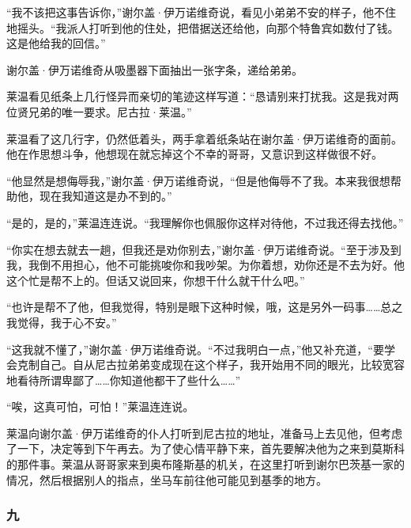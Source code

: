 \par “我不该把这事告诉你，”谢尔盖·伊万诺维奇说，看见小弟弟不安的样子，他不住地摇头。“我派人打听到他的住处，把借据送还给他，向那个特鲁宾如数付了钱。这是他给我的回信。”
\par 谢尔盖·伊万诺维奇从吸墨器下面抽出一张字条，递给弟弟。
\par 莱温看见纸条上几行怪异而亲切的笔迹这样写道：“恳请别来打扰我。这是我对两位贤兄弟的唯一要求。尼古拉·莱温。”
\par 莱温看了这几行字，仍然低着头，两手拿着纸条站在谢尔盖·伊万诺维奇的面前。他在作思想斗争，他想现在就忘掉这个不幸的哥哥，又意识到这样做很不好。
\par “他显然是想侮辱我，”谢尔盖·伊万诺维奇说，“但是他侮辱不了我。本来我很想帮助他，现在我知道这是办不到的。”
\par “是的，是的，”莱温连连说。“我理解你也佩服你这样对待他，不过我还得去找他。”
\par “你实在想去就去一趟，但我还是劝你别去，”谢尔盖·伊万诺维奇说。“至于涉及到我，我倒不用担心，他不可能挑唆你和我吵架。为你着想，劝你还是不去为好。他这个忙是帮不上的。但话又说回来，你想干什么就干什么吧。”
\par “也许是帮不了他，但我觉得，特别是眼下这种时候，哦，这是另外一码事……总之我觉得，我于心不安。”
\par “这我就不懂了，”谢尔盖·伊万诺维奇说。“不过我明白一点，”他又补充道，“要学会克制自己。自从尼古拉弟弟变成现在这个样子，我开始用不同的眼光，比较宽容地看待所谓卑鄙了……你知道他都干了些什么……”
\par “唉，这真可怕，可怕！”莱温连连说。
\par 莱温向谢尔盖·伊万诺维奇的仆人打听到尼古拉的地址，准备马上去见他，但考虑了一下，决定等到下午再去。为了使心情平静下来，首先要解决他为之来到莫斯科的那件事。莱温从哥哥家来到奥布隆斯基的机关，在这里打听到谢尔巴茨基一家的情况，然后根据别人的指点，坐马车前往他可能见到基季的地方。


\subsubsection*{九}

